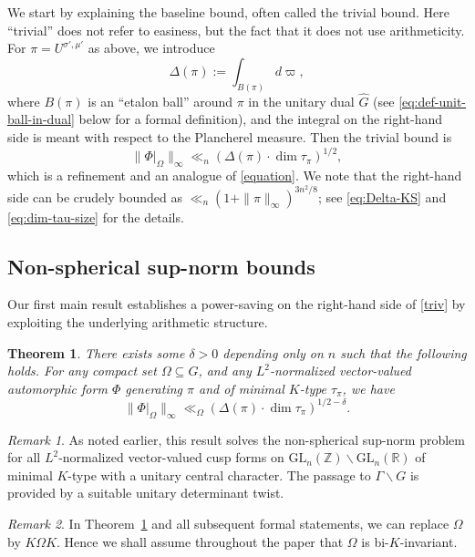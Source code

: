 \documentclass[11pt,oneside]{amsart}
\numberwithin{equation}{section}
\theoremstyle{remark}
\newtheorem{remark}{Remark}
\theoremstyle{plain}
\newtheorem{theorem}{Theorem}
\newcommand\GL{\mathrm{GL}}
\newcommand\ZZ{\mathbb{Z}}
\newcommand\RR{\mathbb{R}}
\newcommand\bs{\backslash}
\begin{document}
We start by explaining the baseline bound, often called the trivial bound. Here ``trivial'' does not refer to easiness, but the fact that it does not use arithmeticity. For $\pi=U^{\sigma',\mu'}$ as above, we introduce
\begin{equation}\label{spectralcontent}
\Delta(\pi):=\int_{B(\pi)} d\varpi,
\end{equation}
where $B(\pi)$ is an ``etalon ball'' around $\pi$ in the unitary dual $\widehat{G}$ (see \eqref{eq:def-unit-ball-in-dual} below for a formal definition), and the integral on the right-hand side is meant with respect to the Plancherel measure. Then the trivial bound is
\begin{equation}\label{triv}
\| \Phi|_{\Omega} \|_{\infty} \ll_n \left(\Delta(\pi) \cdot \dim \tau_{\pi}\right)^{1/2},
\end{equation}
which is a refinement and an analogue of \eqref{equation}. We note that the right-hand side can be crudely bounded as $\ll_n (1+\|\pi\|_\infty)^{3n^2/8}$; see \eqref{eq:Delta-KS} and \eqref{eq:dim-tau-size} for the details.

\subsection{Non-spherical sup-norm bounds}
Our first main result establishes a power-saving on the right-hand side of \eqref{triv} by exploiting the underlying arithmetic structure.

\begin{theorem}\label{thm1} There exists some $\delta > 0$ depending only on $n$ such that the following holds. For any compact set $\Omega\subseteq G$, and any $L^2$-normalized vector-valued automorphic form $\Phi$ generating $\pi$ and of minimal $K$-type $\tau_{\pi}$, we have
\[
\| \Phi|_{\Omega} \|_{\infty} \ll_{\Omega} (\Delta(\pi) \cdot \dim \tau_{\pi})^{1/2 - \delta}.
\]
\end{theorem}

\begin{remark} As noted earlier, this result solves the non-spherical sup-norm problem for all $L^2$-normalized vector-valued cusp forms on $\GL_n(\ZZ)\bs \GL_n(\RR)$ of minimal $K$-type with a unitary central character. The passage to $\Gamma\bs G$ is provided by a suitable unitary determinant twist.
\end{remark}

\begin{remark}\label{rem2} In Theorem~\ref{thm1} and all subsequent formal statements, we can replace $\Omega$ by $K\Omega K$. Hence we shall assume throughout the paper that $\Omega$ is bi-$K$-invariant.
\end{remark}
\end{document}
